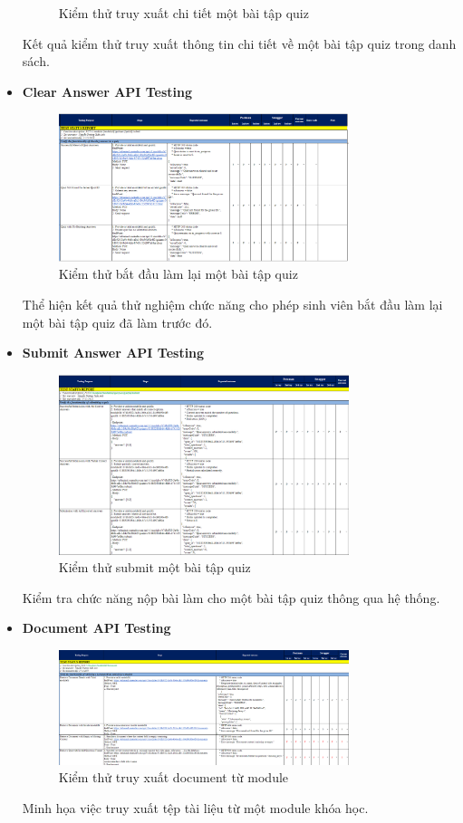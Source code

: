 \begin{itemize}
\begin{figure}[H]
        \caption{Kiểm thử truy xuất chi tiết một bài tập quiz}
    \end{figure}
    Kết quả kiểm thử truy xuất thông tin chi tiết về một bài tập quiz trong danh sách.
    \item \textbf{Clear Answer API Testing}
    \begin{figure}[H]
        \centering
        \includegraphics[width=0.8\textwidth]{Images/test/test_CA.png}
        \caption{Kiểm thử bắt đầu làm lại một bài tập quiz}
    \end{figure}
    Thể hiện kết quả thử nghiệm chức năng cho phép sinh viên bắt đầu làm lại một bài tập quiz đã làm trước đó.
    \item \textbf{Submit Answer API Testing}
    \begin{figure}[H]
        \centering
        \includegraphics[width=0.8\textwidth]{Images/test/test_SA.png}
        \caption{Kiểm thử submit một bài tập quiz}
    \end{figure}
    Kiểm tra chức năng nộp bài làm cho một bài tập quiz thông qua hệ thống.
    \item \textbf{Document API Testing}
    \begin{figure}[H]
        \centering
        \includegraphics[width=0.8\textwidth]{Images/test/test_DO.png}
        \caption{Kiểm thử truy xuất document từ module}
    \end{figure}
    Minh họa việc truy xuất tệp tài liệu từ một module khóa học.
\end{itemize}
